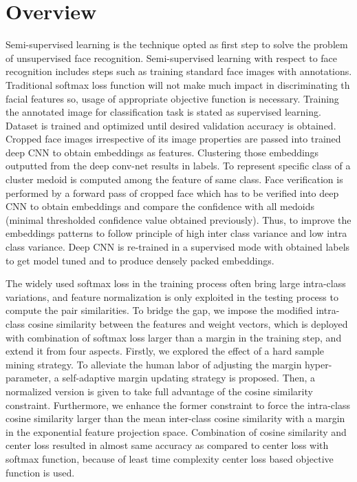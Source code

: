 \documentclass[a4paper,12pt, twoside]{NITKReport}
\begin{document}
\section{Overview}
\par Semi-supervised learning is the technique opted as first step to solve the problem of unsupervised face recognition. Semi-supervised learning with respect to face recognition includes steps such as training standard face images with annotations.  Traditional softmax loss function will not make much impact in discriminating th facial features so, usage of appropriate objective function is necessary. Training the annotated image for classification task is stated as supervised learning. Dataset is trained and optimized until desired validation accuracy is obtained. Cropped face images irrespective of its image properties are passed into trained deep CNN to obtain embeddings as features.  Clustering those embeddings outputted from the deep conv-net results in labels. To represent specific class of a cluster medoid is computed among the feature of same class. Face verification is performed by a forward pass of cropped face which has to be verified into deep CNN to obtain embeddings and compare the confidence with all medoids (minimal thresholded confidence value obtained previously). Thus, to improve the embeddings patterns to follow principle of high inter class variance and low intra class variance. Deep CNN is re-trained in a supervised mode with obtained labels to get model tuned and to produce densely packed embeddings.

\par The widely used softmax loss in the training process often bring large intra-class variations, and feature normalization is only exploited in the testing process to compute the pair similarities.  To bridge the gap, we impose the modified intra-class cosine similarity between the features and weight vectors, which is deployed with combination of softmax loss larger than a margin in the training step, and extend it from four aspects. Firstly, we explored the effect of a hard sample mining strategy. To alleviate the human labor of adjusting the margin hyper-parameter, a self-adaptive margin updating strategy is proposed. Then, a normalized version is given to take full advantage of the cosine similarity constraint. Furthermore, we enhance the former constraint to force the intra-class cosine similarity larger than the mean inter-class cosine similarity with a margin in the exponential feature projection space. Combination of cosine similarity and  center loss resulted in almost same accuracy as compared to center loss with softmax function, because of least time complexity center loss based objective function is used.
\end{document}

